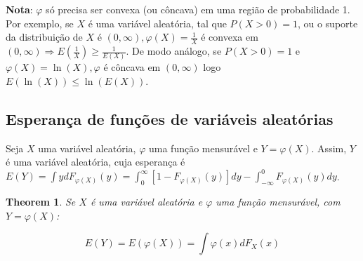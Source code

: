 \documentclass[
]{article}
\newtheorem{theorem}{Theorem}[section]
\theoremstyle{definition}
\theoremstyle{definition}
\theoremstyle{definition}
\theoremstyle{definition}
\theoremstyle{remark}
\begin{document}
\textbf{Nota}: \(\varphi\) só precisa ser convexa (ou côncava) em uma região de probabilidade 1. Por exemplo, se \(X\) é uma variável aleatória, tal que \(P(X > 0) = 1\), ou o suporte da distribuição de \(X\) é \((0, \infty), \varphi(X) = \frac{1}{X}\) é convexa em \((0,\infty) \Rightarrow E\left(\frac{1}{X}\right) \ge \frac{1}{E(X)}\). De modo análogo, se \(P(X > 0) = 1\) e \(\varphi(X) = \ln(X), \varphi\) é côncava em \((0,\infty)\) logo \(E(\ln(X)) \le \ln(E(X))\).

\hypertarget{esperanuxe7a-de-funuxe7uxf5es-de-variuxe1veis-aleatuxf3rias}{%
\subsection{Esperança de funções de variáveis aleatórias}\label{esperanuxe7a-de-funuxe7uxf5es-de-variuxe1veis-aleatuxf3rias}}

Seja \(X\) uma variável aleatória, \(\varphi\) uma função mensurável e \(Y = \varphi(X)\). Assim, \(Y\) é uma variável aleatória, cuja esperança é \(E(Y) = \int ydF_{\varphi(X)}(y) = \int_{0}^{\infty}[1 - F_{\varphi(X)}(y)]dy - \int_{-\infty}^{0}F_{\varphi(X)}(y)dy\).

\begin{theorem}
Se \(X\) é uma variável aleatória e \(\varphi\) uma função mensurável, com \(Y = \varphi(X)\):

\begin{equation*}
E(Y) = E(\varphi(X)) = \int\varphi(x)dF_{X}(x)
\end{equation*}
\end{theorem}
\end{document}
